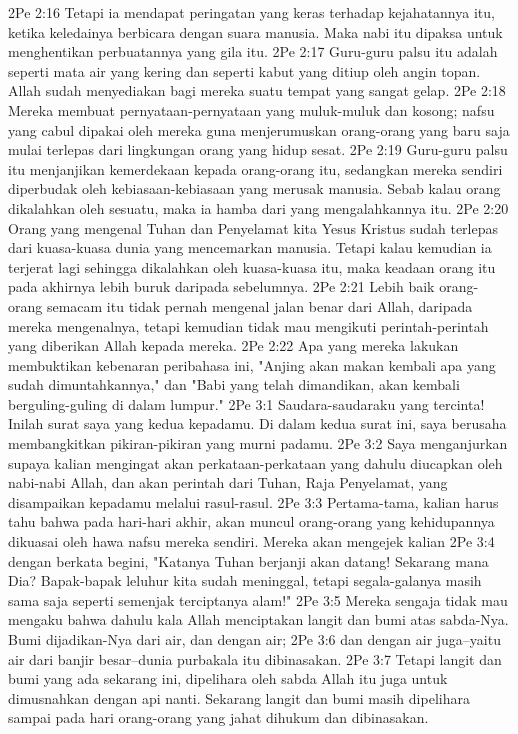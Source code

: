 2Pe 2:16  Tetapi ia mendapat peringatan yang keras terhadap kejahatannya itu, ketika keledainya berbicara dengan suara manusia. Maka nabi itu dipaksa untuk menghentikan perbuatannya yang gila itu.
2Pe 2:17  Guru-guru palsu itu adalah seperti mata air yang kering dan seperti kabut yang ditiup oleh angin topan. Allah sudah menyediakan bagi mereka suatu tempat yang sangat gelap.
2Pe 2:18  Mereka membuat pernyataan-pernyataan yang muluk-muluk dan kosong; nafsu yang cabul dipakai oleh mereka guna menjerumuskan orang-orang yang baru saja mulai terlepas dari lingkungan orang yang hidup sesat.
2Pe 2:19  Guru-guru palsu itu menjanjikan kemerdekaan kepada orang-orang itu, sedangkan mereka sendiri diperbudak oleh kebiasaan-kebiasaan yang merusak manusia. Sebab kalau orang dikalahkan oleh sesuatu, maka ia hamba dari yang mengalahkannya itu.
2Pe 2:20  Orang yang mengenal Tuhan dan Penyelamat kita Yesus Kristus sudah terlepas dari kuasa-kuasa dunia yang mencemarkan manusia. Tetapi kalau kemudian ia terjerat lagi sehingga dikalahkan oleh kuasa-kuasa itu, maka keadaan orang itu pada akhirnya lebih buruk daripada sebelumnya.
2Pe 2:21  Lebih baik orang-orang semacam itu tidak pernah mengenal jalan benar dari Allah, daripada mereka mengenalnya, tetapi kemudian tidak mau mengikuti perintah-perintah yang diberikan Allah kepada mereka.
2Pe 2:22  Apa yang mereka lakukan membuktikan kebenaran peribahasa ini, "Anjing akan makan kembali apa yang sudah dimuntahkannya," dan "Babi yang telah dimandikan, akan kembali berguling-guling di dalam lumpur."
2Pe 3:1  Saudara-saudaraku yang tercinta! Inilah surat saya yang kedua kepadamu. Di dalam kedua surat ini, saya berusaha membangkitkan pikiran-pikiran yang murni padamu.
2Pe 3:2  Saya menganjurkan supaya kalian mengingat akan perkataan-perkataan yang dahulu diucapkan oleh nabi-nabi Allah, dan akan perintah dari Tuhan, Raja Penyelamat, yang disampaikan kepadamu melalui rasul-rasul.
2Pe 3:3  Pertama-tama, kalian harus tahu bahwa pada hari-hari akhir, akan muncul orang-orang yang kehidupannya dikuasai oleh hawa nafsu mereka sendiri. Mereka akan mengejek kalian
2Pe 3:4  dengan berkata begini, "Katanya Tuhan berjanji akan datang! Sekarang mana Dia? Bapak-bapak leluhur kita sudah meninggal, tetapi segala-galanya masih sama saja seperti semenjak terciptanya alam!"
2Pe 3:5  Mereka sengaja tidak mau mengaku bahwa dahulu kala Allah menciptakan langit dan bumi atas sabda-Nya. Bumi dijadikan-Nya dari air, dan dengan air;
2Pe 3:6  dan dengan air juga--yaitu air dari banjir besar--dunia purbakala itu dibinasakan.
2Pe 3:7  Tetapi langit dan bumi yang ada sekarang ini, dipelihara oleh sabda Allah itu juga untuk dimusnahkan dengan api nanti. Sekarang langit dan bumi masih dipelihara sampai pada hari orang-orang yang jahat dihukum dan dibinasakan.
